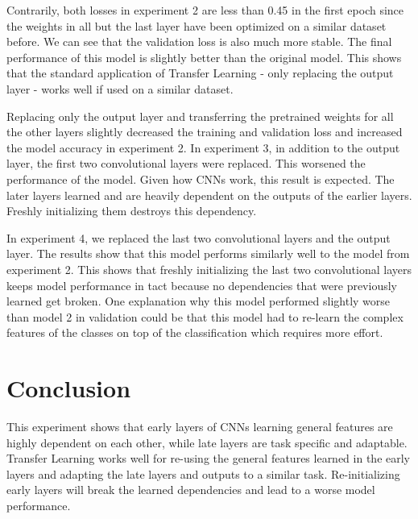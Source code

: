\documentclass{scrartcl}
\begin{document}
Contrarily, both losses in experiment 2 are less than 0.45 in the first epoch
since the weights in all but the last layer have been optimized on a similar dataset before. We can see that the validation loss is also much more stable. The final performance of this model is slightly better than the original model. This shows that the standard application of Transfer Learning - only replacing the output layer - works well if used on a similar dataset. 

Replacing only the output layer and transferring the pretrained weights for all the other layers slightly decreased the training and validation loss and increased the model accuracy in experiment 2. In experiment 3, in addition to the output layer, the first two convolutional layers were replaced. This worsened the performance of the model. Given how CNNs work, this result is expected. The later layers learned and are heavily dependent on the outputs of the earlier layers. Freshly initializing them destroys this dependency.

In experiment 4, we replaced the last two convolutional layers and the output layer. The results show that this model performs similarly well to the model from experiment 2. This shows that freshly initializing the last two convolutional layers keeps model performance in tact because no dependencies that were previously learned get broken. One explanation why this model performed slightly worse than model 2 in validation could be that this model had to re-learn the complex features of the classes on top of the classification which requires more effort. 

\section{Conclusion}
This experiment shows that early layers of CNNs learning general features are highly dependent on each other, while late layers are task specific and adaptable. Transfer Learning works well for re-using the general features learned in the early layers and adapting the late layers and outputs to a similar task. Re-initializing early layers will break the learned dependencies and lead to a worse model performance.
\end{document}
